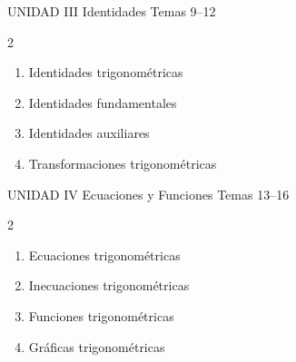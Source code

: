 \vspace{0.4cm}

\begin{tcolorbox}[enhanced, colback=AzulPizarra, colframe=DoradoAcadémico,
    arc=3pt, boxrule=1pt, left=8pt, right=8pt, top=5pt, bottom=5pt,
    fontupper=\sffamily\bfseries\color{white}]
  UNIDAD III \hfill Identidades \hfill Temas 9–12
\end{tcolorbox}
\begin{multicols}{2}
  \begin{enumerate}[label=\textcolor{AzulPizarra}{\textbf{\arabic*.}},
      leftmargin=2em, itemsep=1pt, start=9]
    \item Identidades trigonométricas
    \item Identidades fundamentales
    \item Identidades auxiliares
    \item Transformaciones trigonométricas
  \end{enumerate}
\end{multicols}

\vspace{0.4cm}

\begin{tcolorbox}[enhanced, colback=AzulMedio, colframe=DoradoAcadémico,
    arc=3pt, boxrule=1pt, left=8pt, right=8pt, top=5pt, bottom=5pt,
    fontupper=\sffamily\bfseries\color{white}]
  UNIDAD IV \hfill Ecuaciones y Funciones \hfill Temas 13–16
\end{tcolorbox}
\begin{multicols}{2}
  \begin{enumerate}[label=\textcolor{AzulMedio}{\textbf{\arabic*.}},
      leftmargin=2em, itemsep=1pt, start=13]
    \item Ecuaciones trigonométricas
    \item Inecuaciones trigonométricas
    \item Funciones trigonométricas
    \item Gráficas trigonométricas
  \end{enumerate}
\end{multicols}

\vspace{0.4cm}

